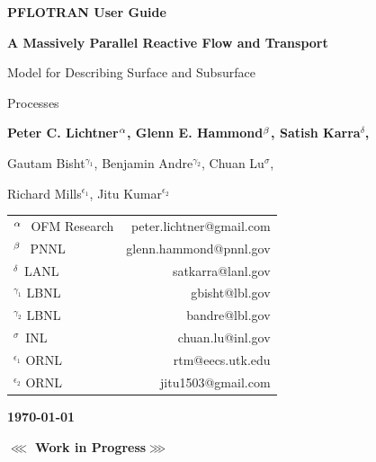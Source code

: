 \begin{center}

\dblline


{\bf\huge PFLOTRAN User Guide}

\vspace{0.5cm}

{\bf\LARGE A Massively Parallel Reactive Flow and Transport 

Model for Describing Surface and Subsurface 

Processes}

\vspace{0.5cm}

{\bf\large Peter C. Lichtner${^{\alpha}}$, Glenn E. Hammond${^{\beta}}$, Satish Karra${^\delta}$, 

Gautam Bisht$^{\gamma_1}$, Benjamin Andre$^{\gamma_2}$, Chuan Lu${^\sigma}$, 

Richard Mills$^{\epsilon_1}$, Jitu Kumar$^{\epsilon_2}$}

\vspace{0.5cm}

\begin{tabular}{lr}
$^{{\alpha}_{~}}$ OFM Research & peter.lichtner@gmail.com\\
$^{{\beta}_{~}}$ PNNL & glenn.hammond@pnnl.gov\\
$^{\delta_{~}}$ LANL & satkarra@lanl.gov\\
$^{\gamma_1^{}}$ LBNL & gbisht@lbl.gov\\
$^{\gamma_2^{}}$ LBNL & bandre@lbl.gov\\
$^{\sigma_{~}}$ INL & chuan.lu@inl.gov\\
$^{\epsilon_1^{}}$ ORNL & rtm@eecs.utk.edu \\
$^{\epsilon_2^{}}$ ORNL & jitu1503@gmail.com
\end{tabular}

\vspace{0.5cm}

{\bf\large\today}


\vspace{1cm}

{\bf\LARGE $\lll$ Work in Progress$\ggg$}

\vspace{1cm}

\end{center}

